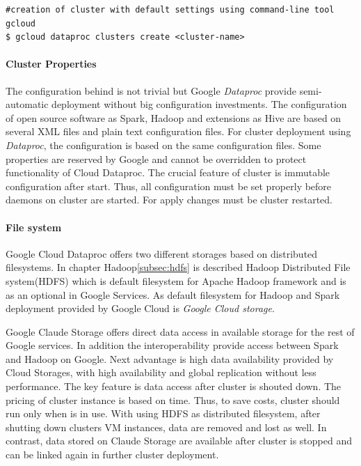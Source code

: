 \documentclass[a4paper,12pt,oneside]{report}
\begin{document}
	
	
	\begin{footnotesize}
		\begin{lstlisting}[style=mybash]
#creation of cluster with default settings using command-line tool gcloud
$ gcloud dataproc clusters create <cluster-name>
		\end{lstlisting}
	\end{footnotesize}
	
	
	\paragraph{Cluster Properties} The configuration behind is not trivial but Google
	\textit{Dataproc} provide 	semi-automatic deployment without big configuration investments.
	The configuration of open source software as Spark, Hadoop  and extensions as Hive	are based 
	on several XML files and plain text configuration files. For cluster deployment 
	using \textit{Dataproc}, the configuration is based on the same configuration	files. Some 
	properties are reserved by Google and cannot be overridden 
	to protect functionality of Cloud Dataproc. The crucial feature of cluster is
	immutable 	configuration after start. Thus, all configuration must be set 
	properly before daemons on cluster are started. For apply changes must be cluster
	restarted. 
	
	\paragraph{File system}
	Google Cloud Dataproc offers two different storages based on distributed
	filesystems. In chapter Hadoop\ref{subsec:hdfs} is described Hadoop Distributed File
	system(HDFS) which is default filesystem for Apache Hadoop framework and is as an optional in Google
	Services. As default filesystem for Hadoop and Spark deployment provided by Google Cloud is
	 \textit{Google Cloud storage}. 
	
	Google Claude Storage offers direct data access in available storage for the
	rest of Google 	services. In addition the interoperability provide access between Spark and
	Hadoop on Google. 	Next advantage is high data availability provided by Cloud
	Storages, with high availability and global replication without less
	performance. The key feature is data access after cluster is shouted down. The 
	pricing of cluster instance is based on time. Thus, to save costs, cluster
	should run only when is in use. With using HDFS as distributed filesystem, after 
	shutting down clusters VM instances, data are removed and lost as well. In contrast,
	data stored on 	Claude Storage are available after cluster is stopped and 
	can be linked again in further cluster deployment.
	
\end{document}
